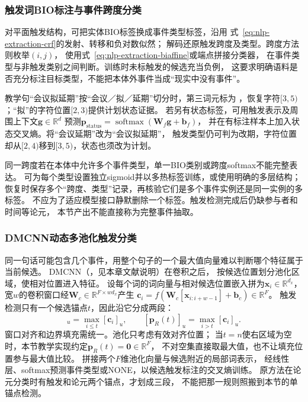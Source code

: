 \subsubsection{触发词BIO标注与事件跨度分类}
\label{sec:nlp-extraction-trigger-tagging}

对平面触发结构，可把实体BIO标签换成事件类型标签，沿用
式~\eqref{eq:nlp-extraction-crf}的发射、转移和负对数似然；
解码还原触发跨度及类型。跨度方法则枚举$(i,j)$，
使用式~\eqref{eq:nlp-extraction-biaffine}或端点拼接分类器，
在事件类型与非触发类别之间判断。训练时未标触发的候选充当负例，
这要求明确语料是否充分标注目标类型，不能把本体外事件当成“现实中没有事件”。

教学句“会议拟延期”按“会议／拟／延期”切分时，第三词元标为
，恢复字符$[3,5)$；“拟”的字符位置$[2,3)$提供计划状态证据。
若另有状态标签，可用触发表示及周围上下文$\bm{g}\in\mathbb{R}^{d}$
预测$\bm{p}_{\mathrm{status}}=\operatorname{softmax}(\bm{W}_{f}\bm{g}+\bm{b}_f)$，
并在有标注样本上加入状态交叉熵。将“会议延期”改为“会议拟延期”，
触发类型仍可判为改期，字符位置却从$[2,4)$移到$[3,5)$，状态也须改为计划。

同一跨度若在本体中允许多个事件类型，单一BIO类别或跨度softmax不能完整表达。
可为每个类型设置独立sigmoid并以多热标签训练，或使用明确的多层结构；
恢复时保存多个“跨度、类型”记录，再核验它们是多个事件实例还是同一实例的多标签。
不应为了适应模型接口静默删除一个标签。触发检测完成后仍缺参与者和时间等论元，
本节产出不能直接称为完整事件抽取。

\subsubsection{DMCNN动态多池化触发分类}
\label{sec:nlp-extraction-dmcnn}

同一句话可能包含几个事件，用整个句子的一个最大值向量难以判断哪个特征属于当前候选。
DMCNN（\citeyear{chen2015dmcnn}，见本章文献说明）在卷积之后，
按候选位置划分池化区域，使相对位置进入特征。
设每个词的词向量与相对候选位置嵌入拼为$\bm{x}_i\in\mathbb{R}^{d_x}$，
宽$w$的卷积窗口经$\bm{W}_c\in\mathbb{R}^{F\times wd_x}$产生
$\bm{c}_i=f(\bm{W}_c[\bm{x}_{i:i+w-1}]+\bm{b}_c)\in\mathbb{R}^{F}$。
触发检测只有一个候选锚点$t$，因此沿它分成两段：
\begin{equation}
  [\bm{p}_{L}(t)]_u=\max_{i\leq t}[\bm{c}_i]_u,\qquad
  [\bm{p}_{R}(t)]_u=\max_{i>t}[\bm{c}_i]_u.
  \label{eq:nlp-extraction-dmcnn}
\end{equation}
窗口对齐和边界填充需统一。池化只考虑有效对齐位置；
当$t=n$使右区域为空时，本节教学实现约定$\bm{p}_R(t)=\bm{0}\in\mathbb{R}^{F}$，
不对空集直接取最大值，也不让填充位置参与最大值比较。
拼接两个$F$维池化向量与候选附近的局部词表示，
经线性层、softmax预测事件类型或NONE，以候选触发标注的交叉熵训练。
原方法在论元分类时有触发和论元两个锚点，才划成三段，
不能把那一规则照搬到本节的单锚点检测。

